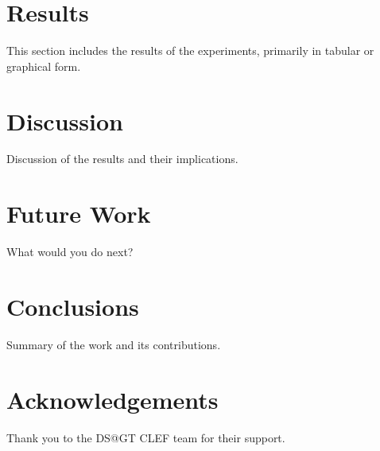 \documentclass[]{style/ceurart}
\begin{document}
\section{Results}

This section includes the results of the experiments, primarily in tabular or graphical form.

\section{Discussion}

Discussion of the results and their implications.

\section{Future Work}

What would you do next?

\section{Conclusions}

Summary of the work and its contributions.

\section*{Acknowledgements}

Thank you to the DS@GT CLEF team for their support.



\end{document}
